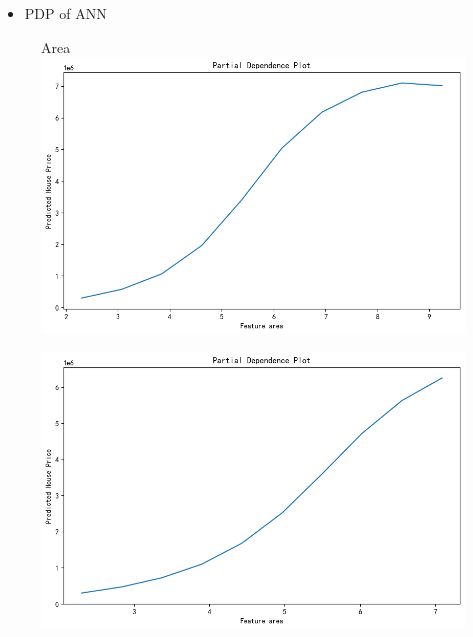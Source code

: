 \documentclass{beamer}
\begin{document}
\begin{frame}
    \begin{itemize}
        \item {\small PDP of ANN}
    \end{itemize}
        \begin{minipage}[t]{0.32\textwidth}
            \begin{figure}
                {\tiny Area}
                \includegraphics[width=\linewidth]{figure/pdp_area_train.png}
            \end{figure}
            \begin{figure}
                \includegraphics[width=\linewidth]{figure/pdp_area_val.png}
            \end{figure}
        \end{minipage}
        \begin{minipage}[t]{0.32\textwidth}
            \begin{figure}

\end{figure}
\end{minipage}
\end{frame}
\end{document}

